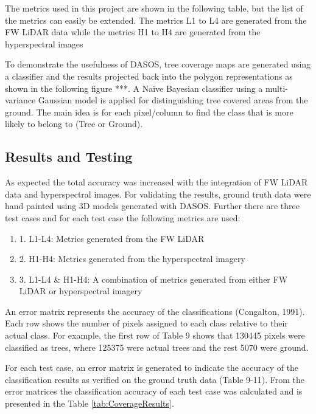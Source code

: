 \documentclass{subfiles}
\begin{document}
\par The metrics used in this project are shown in the following table, but the list of the metrics can easily be extended. The metrics L1 to L4 are generated from the FW LiDAR data while the metrics H1 to H4 are generated from the hyperspectral images

\par To demonstrate the usefulness of DASOS, tree coverage maps are generated using a classifier and the results projected back into the polygon representations as shown in the following figure ***. A Naïve Bayesian classifier using a multi-variance Gaussian model is applied for distinguishing tree covered areas from the ground. The main idea is for each pixel/column to find the class
that is more likely to belong to (Tree or Ground).

\subsection{Results and Testing}
\par As expected the total accuracy was increased with the integration of FW LiDAR data and hyperspectral images. For validating the results, ground truth data were hand painted using 3D models generated with DASOS. Further there are three test cases and for each test case the following metrics are used:

\begin{enumerate}
	\item 1. L1-L4: Metrics generated from the FW LiDAR
	\item 2. H1-H4: Metrics generated from the hyperspectral
imagery
	\item 3. L1-L4 \& H1-H4: A combination of metrics generated from either FW LiDAR or hyperspectral imagery 
\end{enumerate}



\par An error matrix represents the accuracy of the classifications (Congalton, 1991). Each row shows the number of pixels assigned to each class relative to their actual class. For example, the first row of Table 9 shows that 130445 pixels were classified as trees, where 125375 were actual trees and the rest 5070 were ground.

\par For each test case, an error matrix is generated to indicate the accuracy of the classification results as verified on the ground truth data (Table 9-11). From the error matrices the classification accuracy of each test case was calculated and is presented in the Table \ref{tab:CoverageResults}.
\end{document}
